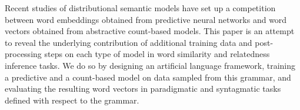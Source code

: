 Recent studies of distributional semantic models have set up a competition between word embeddings obtained from predictive neural networks and word vectors obtained from abstractive count-based models. This paper is an attempt to reveal the underlying contribution of additional training data and post-processing steps on each type of model in word similarity and relatedness inference tasks. We do so by designing an artificial language framework, training a predictive and a count-based model on data sampled from this grammar, and evaluating the resulting word vectors in paradigmatic and syntagmatic tasks defined with respect to the grammar.
